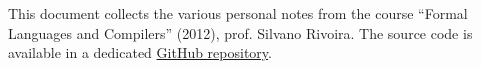 This document collects the various personal notes from the course ``Formal Languages and Compilers'' (2012), prof. Silvano Rivoira.
The \latex source code is available in a dedicated \href{https://github.com/terrinoni/FormalLanguagesAndCompilers-Notes}{GitHub repository}.